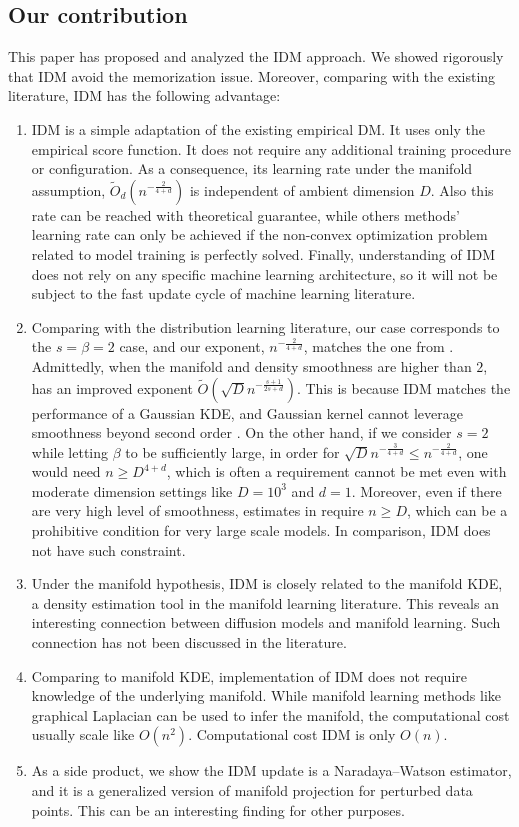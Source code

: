 \documentclass{article}
\def\Otilde{\widetilde{O}}
\begin{document}
\subsection{Our contribution}
This paper has proposed and analyzed  the IDM approach. 
We showed rigorously  that IDM avoid the memorization issue. Moreover, comparing with the existing literature, IDM has the following advantage:
\begin{enumerate}
    \item IDM is a simple adaptation of the existing empirical DM. It uses only the empirical score function. It does not require any additional training procedure or configuration. As a consequence, its learning rate under the manifold assumption, $\Otilde_d(n^{-\frac{2}{4+d}})$ is independent of ambient dimension $D$. Also this rate can be reached with theoretical guarantee, while others methods' learning rate can only be  achieved if the non-convex optimization problem related to model training is perfectly solved. 
    Finally, understanding of IDM does not rely on any specific machine learning architecture, so it will not be subject to the fast update cycle of machine learning literature. 
    \item Comparing with the distribution learning literature, our case corresponds to the $s=\beta=2$ case, and our exponent, $n^{-\frac{2}{4+d}}$, matches the one from \cite{tang2024adaptivity}. Admittedly, when the manifold and density smoothness are higher than $2$, \cite{azangulov2024convergence} has an improved exponent $\Otilde(\sqrt{D} n^{-\frac{s+1}{2s+d}})$. This is because IDM matches the performance of a Gaussian KDE, and Gaussian kernel cannot leverage smoothness beyond second order \cite{tsybakov2009nonparametric}. On the other hand, if we consider $s=2$ while letting $\beta$ to be sufficiently large, in order for $\sqrt{D} n^{-\frac{3}{4+d}}\leq n^{-\frac{2}{4+d}}$, one would need $n\geq D^{4+d}$, which is often a requirement cannot be met even with moderate dimension settings like $D=10^3$ and $d=1$. Moreover, even if there are very high level of smoothness, estimates in \cite{azangulov2024convergence} require $n\geq D$, which can be a prohibitive condition for very large scale models. In comparison, IDM does not have such constraint.
    \item Under the manifold hypothesis, IDM is closely related to the manifold KDE, a density estimation tool in the manifold learning literature. This reveals an interesting connection between diffusion models and manifold learning. Such connection has not been discussed in the literature. 
    \item Comparing to manifold KDE, implementation of IDM does not require knowledge of the underlying manifold. 
    While manifold learning methods like graphical Laplacian can be used to infer the manifold, the computational cost usually scale like $O(n^2)$. Computational cost IDM is only $O(n)$. 
    \item As a side product, we show the IDM update is a Naradaya--Watson estimator, and it is a generalized version of manifold projection for perturbed data points. This can be an interesting finding for other purposes.
\end{enumerate}
\end{document}
